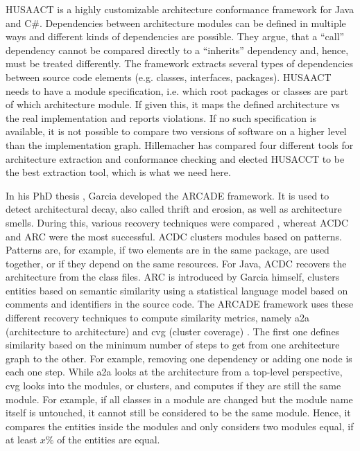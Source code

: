 \documentclass[sigplan, anonymous, review]{acmart}
\begin{document}
HUSAACT \cite{Husacct1,Husacct2} is a highly customizable architecture conformance framework for Java and C\#. Dependencies between architecture modules can be defined in multiple ways and different kinds of dependencies are possible. They argue, that a ``call'' dependency cannot be compared directly to a ``inherits'' dependency and, hence, must be treated differently. 
The framework extracts several types of dependencies between source code elements (e.g. classes, interfaces, packages). HUSAACT needs to have a module specification, i.e. which root packages or classes are part of which architecture module. If given this, it maps the defined architecture vs the real implementation and reports violations.
If no such specification is available, it is not possible to compare two versions of software on a higher level than the implementation graph. 
Hillemacher \cite{MScSteffen} has compared four different tools for architecture extraction and conformance checking and elected HUSACCT to be the best extraction tool, which is what we need here.

In his PhD thesis \cite{arcade-thesis}, Garcia developed the ARCADE framework. It is used to detect architectural decay, also called thrift and erosion, as well as architecture smells. During this, various recovery techniques were compared \cite{arcRec-comparison}, whereat ACDC \cite{ACDC} and ARC were the most successful. 
ACDC clusters modules based on patterns. Patterns are, for example, if two elements are in the same package, are used together, or if they depend on the same resources. For Java, ACDC recovers the architecture from the class files. ARC is introduced by Garcia himself, clusters entities based on semantic similarity using a statistical language model based on comments and identifiers in the source code.
The ARCADE framework uses these different recovery techniques to compute similarity metrics, namely a2a (architecture to architecture) and cvg (cluster coverage) \cite{Arcade}. 
The first one defines similarity based on the minimum number of steps to get from one architecture graph to the other. For example, removing one dependency or adding one node is each one step. While a2a looks at the architecture from a top-level perspective, cvg looks into the modules, or clusters, and computes if they are still the same module. For example, if all classes in a module are changed but the module name itself is untouched, it cannot still be considered to be the same module. Hence, it compares the entities inside the modules and only considers two modules equal, if at least $x \%$ of the entities are equal.
\end{document}
